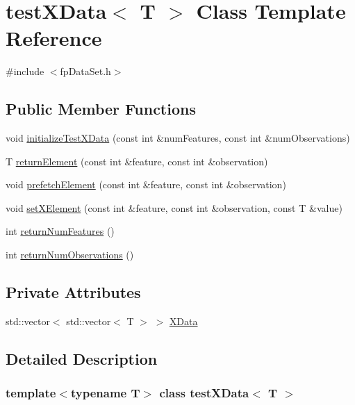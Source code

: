 \hypertarget{classtestXData}{}\section{test\+X\+Data$<$ T $>$ Class Template Reference}
\label{classtestXData}


{\ttfamily \#include $<$fp\+Data\+Set.\+h$>$}

\subsection*{Public Member Functions}
\begin{DoxyCompactItemize}
\item 
void \hyperlink{classtestXData_a198eae2889a3477c6a59038e54fc0e72}{initialize\+Test\+X\+Data} (const int \&num\+Features, const int \&num\+Observations)
\item 
T \hyperlink{classtestXData_ac26a03abde5b65053944ff9f6eec00b6}{return\+Element} (const int \&feature, const int \&observation)
\item 
void \hyperlink{classtestXData_a04843e072396cac0fb8f3417b9dd3f22}{prefetch\+Element} (const int \&feature, const int \&observation)
\item 
void \hyperlink{classtestXData_a3e1c527719cb3f3535fd332270c91553}{set\+X\+Element} (const int \&feature, const int \&observation, const T \&value)
\item 
int \hyperlink{classtestXData_a81de09b65cf32fc0aa728ac48b881b64}{return\+Num\+Features} ()
\item 
int \hyperlink{classtestXData_a11dc79bc56b7a5240c0b7c89e9fbeca1}{return\+Num\+Observations} ()
\end{DoxyCompactItemize}
\subsection*{Private Attributes}
\begin{DoxyCompactItemize}
\item 
std\+::vector$<$ std\+::vector$<$ T $>$ $>$ \hyperlink{classtestXData_aabb02eb5f97c674d6a88c8194498b621}{X\+Data}
\end{DoxyCompactItemize}


\subsection{Detailed Description}
\subsubsection*{template$<$typename T$>$\newline
class test\+X\+Data$<$ T $>$}




